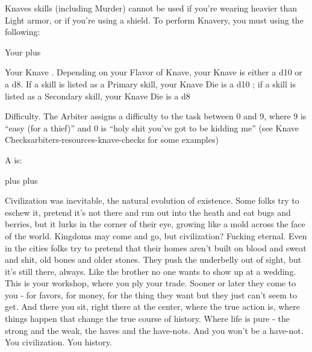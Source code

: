 {  Knaves skills (including Murder) cannot be used if you're wearing heavier than Light armor, or if you're using a shield. To perform Knavery, you must \RO using the following:

  Your \DEX plus


  Your Knave \STATIC.  Depending on your Flavor of Knave, your Knave \STATIC is either a d10 or a d8.  If a skill is listed as a Primary skill, your Knave Die is a d10 \STATIC; if a skill is listed as a Secondary skill, your Knave Die is a d8 \STATIC

  Difficulty. The Arbiter assigns a difficulty to the task between 0 and 9, where 9 is “easy (for a thief)” and 0 is “holy shit you've got to be kidding me” (see {Knave Checks}{arbiters-resources-knave-checks} for some examples)

  A   is:

  \DEX  plus \STATIC plus  




  \newpage


  

  Civilization was inevitable, the natural evolution of existence.  Some folks try to eschew it, pretend it's not there and run out into the heath and eat bugs and berries, but it lurks in the corner of their eye, growing like a mold across the face of the world.  Kingdoms may come and go, but civilization?  Fucking eternal.  Even in the cities folks try to pretend that their homes aren't built on blood and sweat and shit, old bones and older stones.  They push the underbelly out of sight, but it's still there, always.  Like the brother no one wants to show up at a wedding.  This is your workshop, where you ply your trade.  Sooner or later they come to you - for favors, for money, for the thing they want but they just can't seem to get.  And there you sit, right there at the center, where the true action is, where things happen that change the true course of history.  Where life is pure - the strong and the weak, the haves and the have-nots. And you won't be a have-not.  You   civilization.  You   history.

}
